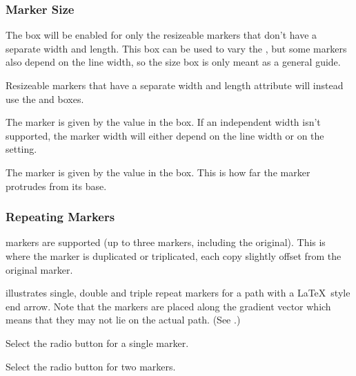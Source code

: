 \subsubsection{Marker Size}\label{sec:markersize}



The  box will be enabled for only the
resizeable markers that don't have a separate width and length. 
This box can be used to vary the 
,
but some markers also depend on the line width, so the size box is
only meant as a general guide.

Resizeable markers that have a separate width and length attribute
will instead use the  and 
boxes.


The marker  is given by the value
in the  box. If an independent width isn't
supported, the marker width will either depend on the line width or
on the  setting.


The marker  is given by the value in the
 box. This is how far the marker protrudes from its
base.

\subsubsection{Repeating Markers}\label{sec:repeatingmarkers}

 markers are supported (up to
three markers, including the original). This is where the marker is
duplicated or triplicated, each copy slightly offset from the original marker.

 illustrates single, double and triple
repeat markers for a path with a \LaTeX\ style end arrow. Note that
the markers are placed along the gradient vector which means that
they may not lie on the actual path. (See
.)


Select the  radio button for a single marker.


Select the  radio button for two markers.

